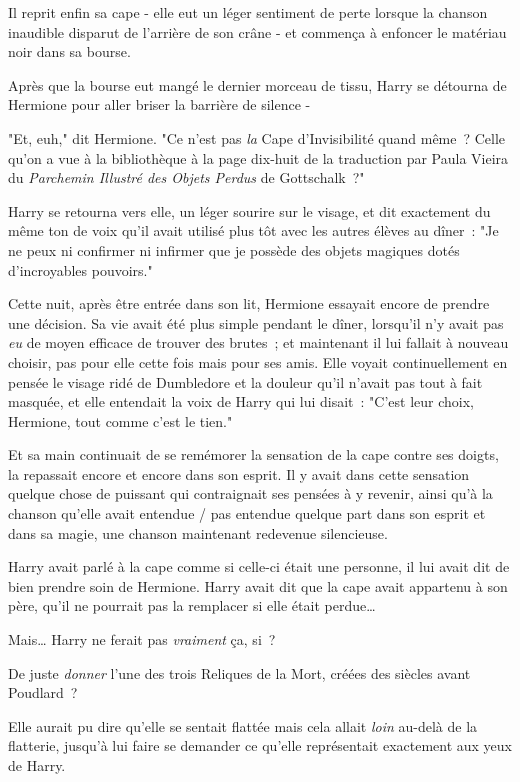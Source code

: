 Il reprit enfin sa cape - elle eut un léger sentiment de perte lorsque la chanson inaudible disparut de l'arrière de son crâne - et commença à enfoncer le matériau noir dans sa bourse.

Après que la bourse eut mangé le dernier morceau de tissu, Harry se détourna de Hermione pour aller briser la barrière de silence -

"Et, euh," dit Hermione. "Ce n'est pas \emph{la} Cape d'Invisibilité quand même~? Celle qu'on a vue à la bibliothèque à la page dix-huit de la traduction par Paula Vieira du \emph{Parchemin Illustré des Objets Perdus} de Gottschalk~?"

Harry se retourna vers elle, un léger sourire sur le visage, et dit exactement du même ton de voix qu'il avait utilisé plus tôt avec les autres élèves au dîner~: "Je ne peux ni confirmer ni infirmer que je possède des objets magiques dotés d'incroyables pouvoirs."

\later

Cette nuit, après être entrée dans son lit, Hermione essayait encore de prendre une décision. Sa vie avait été plus simple pendant le dîner, lorsqu'il n'y avait pas \emph{eu} de moyen efficace de trouver des brutes~; et maintenant il lui fallait à nouveau choisir, pas pour elle cette fois mais pour ses amis. Elle voyait continuellement en pensée le visage ridé de Dumbledore et la douleur qu'il n'avait pas tout à fait masquée, et elle entendait la voix de Harry qui lui disait~: "C'est leur choix, Hermione, tout comme c'est le tien."

Et sa main continuait de se remémorer la sensation de la cape contre ses doigts, la repassait encore et encore dans son esprit. Il y avait dans cette sensation quelque chose de puissant qui contraignait ses pensées à y revenir, ainsi qu'à la chanson qu'elle avait entendue / pas entendue quelque part dans son esprit et dans sa magie, une chanson maintenant redevenue silencieuse.

Harry avait parlé à la cape comme si celle-ci était une personne, il lui avait dit de bien prendre soin de Hermione. Harry avait dit que la cape avait appartenu à son père, qu'il ne pourrait pas la remplacer si elle était perdue…

Mais… Harry ne ferait pas \emph{vraiment} ça, si~?

De juste \emph{donner} l'une des trois Reliques de la Mort, créées des siècles avant Poudlard~?

Elle aurait pu dire qu'elle se sentait flattée mais cela allait \emph{loin} au-delà de la flatterie, jusqu'à lui faire se demander ce qu'elle représentait exactement aux yeux de Harry.

